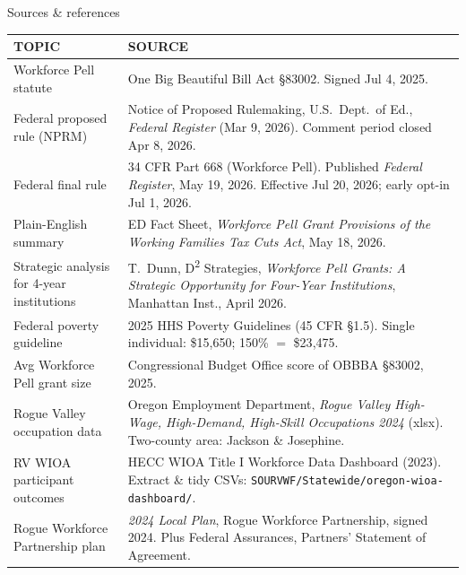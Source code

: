 \documentclass[aspectratio=169,11pt]{beamer}
\newcommand{\eyebrow}[1]{%
  {\sffamily\fontsize{7.5pt}{9pt}\selectfont
   \color{textMuted}%
   \MakeUppercase{#1}%
  }%
}
\newcommand{\theEyebrowText}{}
\newcommand{\frametitleEyebrow}[1]{\renewcommand{\theEyebrowText}{#1}}
\begin{document}
\frametitleEyebrow{Annex / sources \& references}
\begin{frame}{Sources \& references}
  \rmfamily\fontsize{8.4pt}{11pt}\selectfont
  \color{textPrimary}
  \renewcommand{\arraystretch}{1.18}
  \begin{tabular}{@{}p{4.6cm}p{9.4cm}@{}}
    \toprule
    \eyebrow{topic} & \eyebrow{source}\\
    \midrule
    Workforce Pell statute
      & One Big Beautiful Bill Act \S 83002. Signed Jul 4, 2025.\\
    \addlinespace[1pt]
    Federal proposed rule (NPRM)
      & Notice of Proposed Rulemaking, U.S.\ Dept.\ of Ed., \emph{Federal Register} (Mar 9, 2026). Comment period closed Apr 8, 2026.\\
    \addlinespace[1pt]
    Federal final rule
      & 34 CFR Part 668 (Workforce Pell). Published \emph{Federal Register}, May 19, 2026. Effective Jul 20, 2026; early opt-in Jul 1, 2026.\\
    \addlinespace[1pt]
    Plain-English summary
      & ED Fact Sheet, \emph{Workforce Pell Grant Provisions of the Working Families Tax Cuts Act}, May 18, 2026.\\
    \addlinespace[1pt]
    Strategic analysis for 4-year institutions
      & T.\ Dunn, D\textsuperscript{2} Strategies, \emph{Workforce Pell Grants: A Strategic Opportunity for Four-Year Institutions}, Manhattan Inst., April 2026.\\
    \addlinespace[1pt]
    Federal poverty guideline
      & 2025 HHS Poverty Guidelines (45 CFR \S 1.5). Single individual: \$15{,}650; 150\% $=$ \$23{,}475.\\
    \addlinespace[1pt]
    Avg Workforce Pell grant size
      & Congressional Budget Office score of OBBBA \S 83002, 2025.\\
    \midrule
    Rogue Valley occupation data
      & Oregon Employment Department, \emph{Rogue Valley High-Wage, High-Demand, High-Skill Occupations 2024\textendash 2034} (xlsx). Two-county area: Jackson \& Josephine.\\
    \addlinespace[1pt]
    RV WIOA participant outcomes
      & HECC WIOA Title I Workforce Data Dashboard (2023). Extract \& tidy CSVs: \texttt{SOURVWF/Statewide/oregon-wioa-dashboard/}.\\
    \addlinespace[1pt]
    Rogue Workforce Partnership plan
      & \emph{2024\textendash 2028 Local Plan}, Rogue Workforce Partnership, signed 2024. Plus Federal Assurances, Partners' Statement of Agreement.\\

\end{tabular}
\end{frame}
\end{document}
